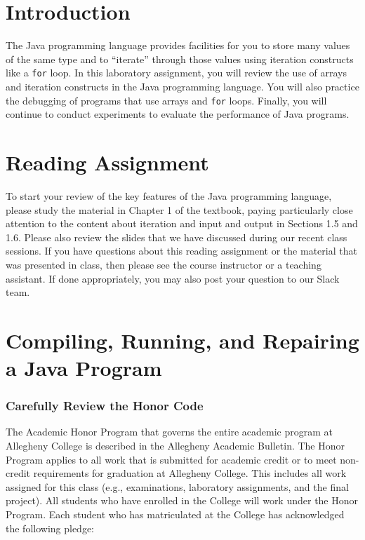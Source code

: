 

\usepackage[compact]{titlesec}



\section*{Introduction}

The Java programming language provides facilities for you to store many values of the same type and to ``iterate''
through those values using iteration constructs like a {\tt for} loop. In this laboratory assignment, you will review
the use of arrays and iteration constructs in the Java programming language. You will also practice the debugging of
programs that use arrays and {\tt for} loops. Finally, you will continue to conduct experiments to evaluate the
performance of Java programs.

\section*{Reading Assignment}

To start your review of the key features of the Java programming language, please study the material in Chapter 1 of the
textbook, paying particularly close attention to the content about iteration and input and output in Sections 1.5 and
1.6. Please also review the slides that we have discussed during our recent class sessions. If you have questions about
this reading assignment or the material that was presented in class, then please see the course instructor or a teaching
assistant. If done appropriately, you may also post your question to our Slack team.

\section*{Compiling, Running, and Repairing a Java Program}

\vspace*{-.11in}
\subsubsection*{Carefully Review the Honor Code}

The Academic Honor Program that governs the entire academic program at Allegheny College is described in the Allegheny
Academic Bulletin.  The Honor Program applies to all work that is submitted for academic credit or to meet non-credit
requirements for graduation at Allegheny College.  This includes all work assigned for this class (e.g., examinations,
  laboratory assignments, and the final project).  All students who have enrolled in the College will work under the Honor
Program.  Each student who has matriculated at the College has acknowledged the following pledge:

